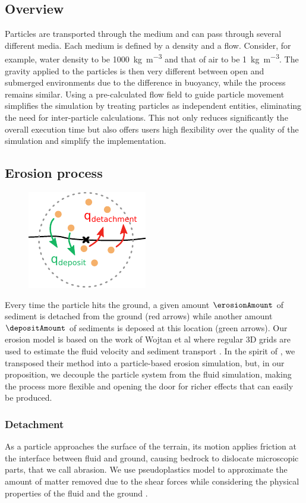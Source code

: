 \subsection{Overview}
Particles are transported through the medium and can pass through several different media. Each medium is defined by a density and a flow. Consider, for example, water density to be \SI{1000}{\kilogram \per \cubic \meter} and that of air to be \SI{1}{\kilogram \per \cubic \meter}. The gravity applied to the particles is then very different between open and submerged environments due to the difference in buoyancy, while the process remains similar.
Using a pre-calculated flow field to guide particle movement simplifies the simulation by treating particles as independent entities, eliminating the need for inter-particle calculations. This not only reduces significantly the overall execution time but also offers users high flexibility over the quality of the simulation and simplify the implementation. 
\subsection{Erosion process}
\begin{figure}
\centering
\includegraphics{figures/erosion_deposition.pdf}

\end{figure}
Every time the particle hits the ground, a given amount $\erosionAmount$ of sediment is detached from the ground (red arrows) while another amount $\depositAmount$ of sediments is deposed at this location (green arrows). Our erosion model is based on the work of Wojtan et al where regular 3D grids are used to estimate the fluid velocity and sediment transport \cite{Wojtan2007}. In the spirit of \cite{Kristof2009}, we transposed their method into a particle-based erosion simulation, but, in our proposition, we decouple the particle system from the fluid simulation, making the process more flexible and opening the door for richer effects that can easily be produced. 

\subsubsection{Detachment}
As a particle approaches the surface of the terrain, its motion applies friction at the interface between fluid and ground, causing bedrock to dislocate microscopic parts, that we call abrasion. We use pseudoplastics model to approximate the amount of matter removed due to the shear forces while considering the physical properties of the fluid and the ground \cite{Wojtan2007}. 

